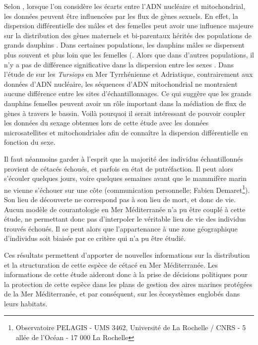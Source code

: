 \documentclass[a4paper,12pt,twoside]{article}\usepackage[]{graphicx}\usepackage[]{color}
\begin{document}
\begin {bibunit} [newbst]
Selon \citet{gaspari2015population}, lorsque l'on considère les écarts entre l'ADN nucléaire et mitochondrial, les données peuvent être influencées par les flux de gènes sexuels. En effet, la dispersion différentielle des mâles et des femelles peut avoir une influence majeure sur la distribution des gènes maternels et bi-parentaux hérités des populations de grands dauphins \citep{hoelzel1998genetic}. Dans certaines populations, les dauphins mâles se dispersent plus souvent et plus loin que les femelles (\citep{krutzen2004population, moller2004genetic}. Alors que dans d'autres populations, il n'y a pas de différence significative dans la dispersion entre les sexes \citep{natoli2005habitat}. Dans l'étude de \citet{gaspari2015population} sur les \emph{Tursiops} en Mer Tyrrhénienne et Adriatique, contrairement aux données d'ADN nucléaire, les séquences d'ADN mitochondrial ne montraient aucune différence entre les sites d'échantillonnages. Ce qui suggère que les grands dauphins femelles peuvent avoir un rôle important dans la médiation de flux de gènes à travers le bassin. Voilà pourquoi il serait intéressant de pouvoir coupler les données du sexage obtenues lors de cette étude avec les données microsatellites et mitochondriales afin de connaître la dispersion différentielle en fonction du sexe.

Il faut néanmoins garder à l'esprit que la majorité des individus échantillonnés provient de cétacés échoués, et parfois en état de putréfaction. Il peut alors s'écouler quelques jours, voire quelques semaines avant que le mammifère marin ne vienne s'échouer sur une côte (communication personnelle; Fabien Demaret\footnote{Observatoire PELAGIS - UMS 3462, Université de La Rochelle / CNRS - 5 allée de l’Océan - 17 000 La Rochelle}). Son lieu de découverte ne correspond pas à son lieu de mort, et donc de vie. Aucun modèle de courantologie en Mer Méditerranée n'a pu être couplé à cette étude, ne permettant donc pas d'interpoler le véritable lieu de vie des individus trouvés échoués. Il se peut alors que l'appartenance à une zone géographique d'individus soit biaisée par ce critère qui n'a pu être étudié.

Ces résultats permettent d'apporter de nouvelles informations sur la distribution et la structuration de cette espèce de cétacé en Mer Méditerranée. Les informations de cette étude aideront donc à la prise de décisions politiques pour la protection de cette espèce dans les plans de gestion des aires marines protégées de la Mer Méditerranée, et par conséquent, sur les écosystèmes englobés dans leurs habitats.



\end{bibunit}
\end{document}
